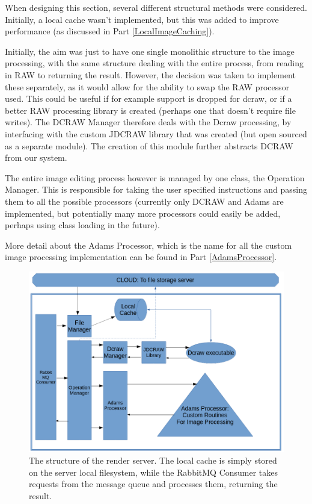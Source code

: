 \documentclass[10pt,a4paper]{article}
\begin{document}
When designing this section, several different structural methods were considered. Initially, a local
cache wasn't implemented, but this was added to improve performance (as discussed in Part \ref{LocalImageCaching}).

Initially, the aim was just to have one single monolithic structure to the image processing, with the same structure
dealing with the entire process, from reading in RAW to returning the result. However, the decision was taken to
implement these separately, as it would allow for the ability to swap the RAW processor used. This could be useful
if for example support is dropped for dcraw, or if a better RAW processing library is created (perhaps one that doesn't 
require file writes). The DCRAW Manager therefore deals with the Dcraw processing, by interfacing with the custom JDCRAW
library that was created (but open sourced as a separate module). The creation of this module further abstracts DCRAW from
our system.

The entire image editing process however is managed by one class, the Operation Manager. This is responsible for taking the user
specified instructions and passing them to all the possible processors (currently only DCRAW and Adams are implemented, but potentially
many more processors could easily be added, perhaps using class loading in the future).

More detail about the Adams Processor, which is the name for all the custom image processing implementation can be found in Part \ref{AdamsProcessor}.
\begin{figure}\label{renderserverdiagram}
    \includegraphics[width=\linewidth]{renderserverdiagram}
    \caption{The structure of the render server. The local cache is simply stored on the server local filesystem,
    while the RabbitMQ Consumer takes requests from the message queue and processes them, returning the result.}
\end{figure}
\end{document}
